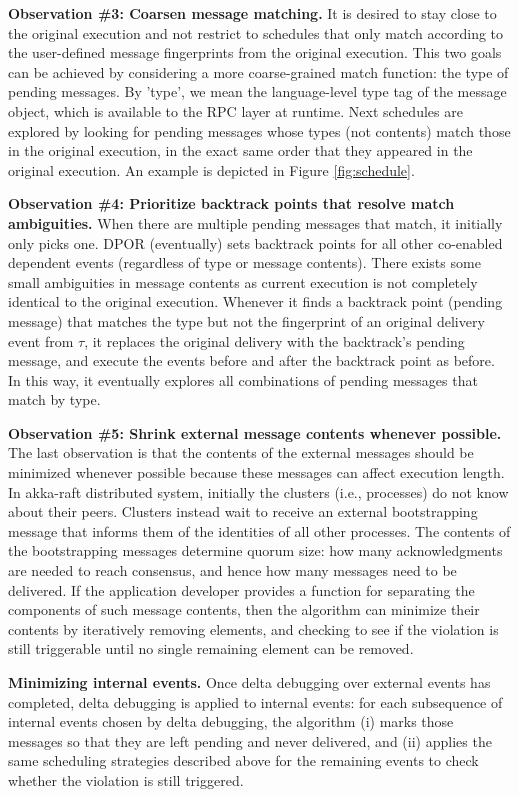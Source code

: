 \textbf{Observation \#3: Coarsen message matching.} It is desired to stay close to the original execution and not restrict to schedules that only match according to the user-defined message fingerprints from the original execution. This two goals can be achieved by considering a more coarse-grained match function: the type of pending messages. By 'type', we mean the language-level type tag of the message object, which is available to the RPC layer at runtime. Next schedules are explored by looking for pending messages whose types (not contents) match those in the original execution, in the exact same order that they appeared in the original execution. An example is depicted in Figure \ref{fig:schedule}.

\textbf{Observation \#4: Prioritize backtrack points that resolve match ambiguities. } When there are multiple pending messages that match, it initially only picks one. DPOR (eventually) sets backtrack points for all other co-enabled dependent events (regardless of type or message contents). There exists some small ambiguities in message contents as current execution is not completely identical to the original execution. Whenever it finds a backtrack point (pending message) that matches the type but not the fingerprint of an original delivery event from $\tau$, it replaces the original delivery with the backtrack's pending message, and execute the events before and after the backtrack point as before. In this way, it eventually explores all combinations of pending messages that match by type.


\textbf{Observation \#5: Shrink external message contents whenever possible. } The last observation is that the contents of the external messages should be minimized whenever possible because these messages can affect execution length. In akka-raft distributed system, initially the clusters (i.e., processes) do not know about their peers. Clusters instead wait to receive an external bootstrapping message that informs them of the identities of all other processes. The contents of the bootstrapping messages determine quorum size: how many acknowledgments are needed to reach consensus, and hence how many messages need to be delivered. If the application developer provides a function for separating the components of such message contents, then the algorithm  can minimize their contents by iteratively removing elements, and checking to see if the violation is still triggerable until no single remaining element can be removed.

\textbf{Minimizing internal events.} Once delta debugging over external events has completed, delta debugging is applied to internal events: for each subsequence of internal events chosen by delta debugging, the algorithm (i) marks those messages so that they are left pending and never delivered, and (ii) applies the same scheduling strategies described above for the remaining events to check whether the violation is still triggered.

